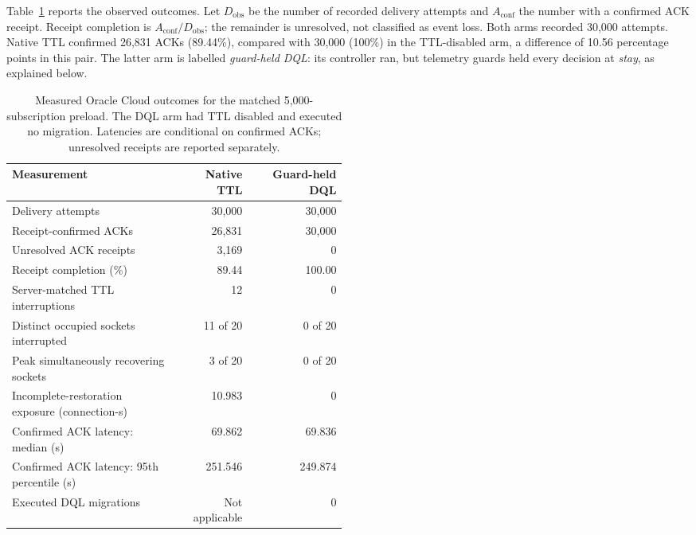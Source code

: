 Table~\ref{tab:ttl-preload-results} reports the observed outcomes. Let
$D_{\mathrm{obs}}$ be the number of recorded delivery attempts and
$A_{\mathrm{conf}}$ the number with a confirmed ACK receipt. Receipt completion is
$A_{\mathrm{conf}}/D_{\mathrm{obs}}$; the remainder is unresolved, not classified as
event loss. Both arms recorded 30,000 attempts. Native TTL confirmed 26,831 ACKs
(89.44\%), compared with 30,000 (100\%) in the TTL-disabled arm, a difference of
10.56 percentage points in this pair. The latter arm is labelled
\emph{guard-held DQL}: its controller ran, but telemetry guards held every
decision at \emph{stay}, as explained below.

\begin{table}[!htbp]
 \centering
 \small
 \renewcommand{\arraystretch}{1.14}
 \caption{Measured Oracle Cloud outcomes for the matched 5,000-subscription
 preload. The DQL arm had TTL disabled and executed no migration. Latencies
 are conditional on confirmed ACKs; unresolved receipts are reported separately.}
 \label{tab:ttl-preload-results}
 \begin{tabular}{p{0.49\linewidth}rr}
  \toprule
  Measurement & Native TTL & Guard-held DQL \\
  \midrule
  Delivery attempts & 30,000 & 30,000 \\
  Receipt-confirmed ACKs & 26,831 & 30,000 \\
  Unresolved ACK receipts & 3,169 & 0 \\
  Receipt completion (\%) & 89.44 & 100.00 \\
  Server-matched TTL interruptions & 12 & 0 \\
  Distinct occupied sockets interrupted & 11 of 20 & 0 of 20 \\
  Peak simultaneously recovering sockets & 3 of 20 & 0 of 20 \\
  Incomplete-restoration exposure (connection-s) & 10.983 & 0 \\
  Confirmed ACK latency: median (s) & 69.862 & 69.836 \\
  Confirmed ACK latency: 95th percentile (s) & 251.546 & 249.874 \\
  Executed DQL migrations & Not applicable & 0 \\
  \bottomrule
 \end{tabular}
\end{table}

